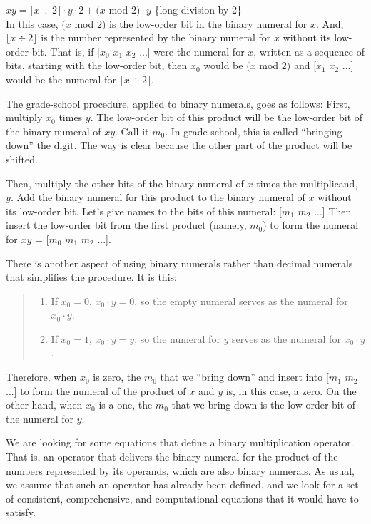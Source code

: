 \hspace{2cm} $xy = \lfloor x \div 2 \rfloor \cdot y \cdot 2 + (x$ mod $2) \cdot y$
\hfill \{long division by 2\} \\

In this case, $(x$ mod $2)$ is the low-order bit in the binary numeral for $x$.
And, $\lfloor x \div 2 \rfloor$ is the number represented by the binary numeral for $x$
without its low-order bit.
That is, if [$x_0$ $x_1$ $x_2$ ...] were the numeral for $x$,
written as a sequence of bits, starting with the low-order bit,
then $x_0$ would be $(x$ mod $2)$ and [$x_1$ $x_2$ ...] would be the numeral for
$\lfloor x \div 2 \rfloor$.

The grade-school procedure, applied to binary numerals, goes as follows:
First, multiply $x_0$ times $y$. The low-order bit of this product will be the low-order bit
of the binary numeral of $xy$. Call it $m_0$. In grade school, this is called ``bringing
down'' the digit. The way is clear because the other part of the product will be shifted.

Then, multiply the other bits of the binary numeral of $x$ times the multiplicand, $y$.
Add the binary numeral for this product to the binary numeral of $x$ without its
low-order bit. Let's give names to the bits of this numeral: [$m_1$ $m_2$ ...]
Then insert the low-order bit from the first product (namely, $m_0$) to form
the numeral for $xy$ = [$m_0$ $m_1$ $m_2$ ...].

There is another aspect of using binary numerals rather than decimal numerals
that simplifies the procedure. It is this:
\begin{quote}
\begin{enumerate}
  \item If $x_0 = 0$, $x_0 \cdot y = 0$,
        so the empty numeral serves as the numeral for $x_0 \cdot y$.
  \item If $x_0 = 1$,
        $x_0 \cdot y = y$, so the numeral for $y$ serves
        as the numeral for $x_0 \cdot y$.
\end{enumerate}
\end{quote}

Therefore, when $x_0$ is zero, the $m_0$ that we ``bring down'' and insert into
[$m_1$ $m_2$ ...] to form the numeral of the product of $x$ and $y$
is, in this case, a zero. On the other hand, when $x_0$ is a one,
the $m_0$ that we bring down is the low-order bit of the numeral for $y$.

We are looking for some equations that define a binary multiplication operator.
That is, an operator that delivers the binary numeral for the product of the numbers
represented by its operands, which are also binary numerals.
As usual, we assume that such an operator has already been defined,
and we look for a set of consistent, comprehensive, and computational
equations that it would have to satisfy.

